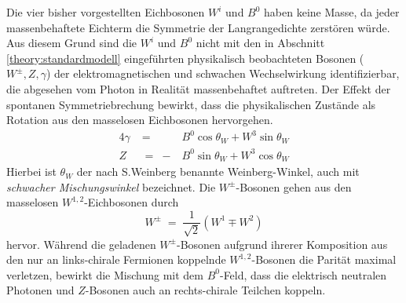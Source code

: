 Die vier bisher vorgestellten Eichbosonen $W^i$ und $B^0$ haben keine Masse, da
jeder massenbehaftete Eichterm die Symmetrie der Langrangedichte zerstören
würde. Aus diesem Grund sind die $W^i$ und $B^0$ nicht mit den in Abschnitt
\ref{theory:standardmodell} eingeführten physikalisch beobachteten Bosonen
($W^\pm, Z, \gamma$) der elektromagnetischen und schwachen Wechselwirkung
identifizierbar, die abgesehen vom Photon in Realität massenbehaftet auftreten.
Der Effekt der spontanen Symmetriebrechung bewirkt, dass die physikalischen
Zustände als Rotation aus den masselosen Eichbosonen hervorgehen.
\begin{alignat}{4}
    \gamma &\;=\;  &B^0 \cos\theta_W + W^3\sin\theta_W \\
    Z      &\;=\; -&B^0 \sin\theta_W + W^3\cos\theta_W
\end{alignat}
Hierbei ist $\theta_W$ der nach S.Weinberg benannte Weinberg-Winkel, auch mit
\textit{schwacher Mischungswinkel} bezeichnet. Die $W^\pm$-Bosonen gehen aus den
masselosen $W^{1,2}$-Eichbosonen durch
\begin{equation}
    W^\pm \;=\; \frac{1}{\sqrt{2}} \left( W^1 \mp W^2 \right)
\end{equation}
hervor. Während die geladenen $W^\pm$-Bosonen aufgrund ihrerer Komposition aus
den nur an links-chirale Fermionen koppelnde $W^{1,2}$-Bosonen die Parität
maximal verletzen, bewirkt die Mischung mit dem $B^0$-Feld, dass die elektrisch
neutralen Photonen und $Z$-Bosonen auch an rechts-chirale Teilchen koppeln.

